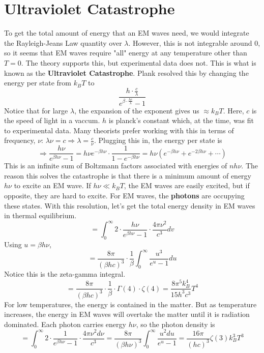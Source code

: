 \documentclass[../main.tex]{subfiles}
\begin{document}
\section{Ultraviolet Catastrophe}
To get the total amount of energy that an EM waves need,
we would integrate the Rayleigh-Jeans Law quantity over $\lambda$. However, this is not integrable around $0$, so 
it seems that EM waves require "all" energy at any temperature other than $T=0$. 
The theory supports this, but experimental data does not. This is what is known as the \textbf{Ultraviolet Catastrophe}.
Plank resolved this by changing the energy per state from $k_{B}T$ to 
$$\frac{h\cdot \frac{c}{\lambda}}{e^{\beta\cdot \frac{hc}{\lambda}}-1}$$
Notice that for large $\lambda$, the expansion of the exponent gives us $\approx k_{B}T$.
Here, $c$ is the speed of light in a vaccum. $h$ is planck's constant which, at the time, was fit to experimental data.
Many theorists prefer working with this in terms of frequency, $\nu$: $\lambda \nu =c\Rightarrow \lambda=\frac{c}{\nu}$.
Plugging this in, the energy per state is
$$\Rightarrow\frac{h\nu}{e^{\beta h\nu}-1}
=h\nu e^{-\beta h\nu}\cdot\frac{1}{1-e^{-\beta h\nu}}
=h\nu\left(e^{-\beta h\nu}+e^{-2\beta h\nu}+\cdots\right)
$$
This is an infinite sum of Boltzmann factors associated with energies of $nh\nu$.
The reason this solves the catastrophe is that there is a minimum amount of energy $h\nu$
to excite an EM wave. If $h\nu \ll k_{B}T$, the EM waves are easily excited, but if opposite, 
they are hard to excite. For EM waves, the \textbf{photons} are occupying these states.
With this resolution, let's get the total energy density in EM waves in thermal equilibrium.
$$=\int_{0}^{\infty}2\cdot\frac{h\nu}{e^{\beta h\nu}-1}\cdot \frac{4\pi \nu^{2}}{c^{3}}dv$$
Using $u=\beta h\nu$,
$$=\frac{8\pi}{(\beta hc)^{3}}\cdot\frac{1}{\beta}\int_{0}^{\infty}\frac{u^{3}}{e^{u}-1}du$$
Notice this is the zeta-gamma integral.
$$=\frac{8\pi}{(\beta hc)^{3}}\cdot\frac{1}{\beta}\cdot\Gamma(4)\cdot\zeta(4)
=\boxed{\frac{8\pi^{5}k_{B}^{4}}{15h^{3}c^{3}}T^{4}}
$$
For low temperatures, the energy is contained in the matter. But as temperature increases, the energy
in EM waves will overtake the matter until it is radiation dominated.
Each photon carries energy $h\nu$, so the photon density is
$$=\int_{0}^{\infty}2\cdot\frac{1}{e^{\beta h\nu}-1}\cdot\frac{4\pi\nu^{2}d\nu}{c^{3}}
=\frac{8\pi}{(\beta h\nu)^{3}}\int_{0}^{\infty}\frac{u^{2}du}{e^{u}-1}
=\boxed{\frac{16\pi}{(hc)^{3}}\zeta(3)k_{B}^{3}T^{3}}
$$
\end{document}
